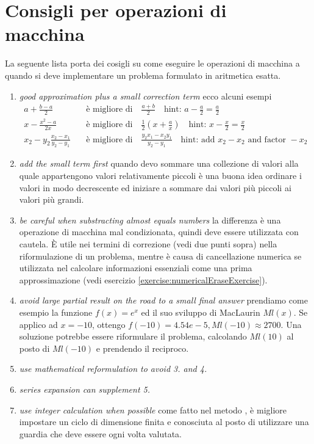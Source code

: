 \section{Consigli per operazioni di macchina}
La seguente lista porta dei cosigli su come eseguire le operazioni di macchina a
quando si deve implementare un problema formulato in aritmetica esatta.

\begin{enumerate}
\item \emph{good approximation plus a small correction term} ecco alcuni
esempi
\begin{displaymath}
\begin{split}
a + \frac{b - a}{2} \quad & \text{\`e migliore di} \quad \frac{a + b}{2} \quad
\text{hint: } a - \frac{a}{2} = \frac{a}{2} \\ 
x - \frac{x^{2} - a}{2x} \quad & \text{\`e migliore di} \quad \frac{1}{2}\left
(x + \frac{a}{x} \right ) \quad \text{hint: } x - \frac{x}{2} = \frac{x}{2} \\
x_{2} - y_{2} \frac{x_{2} - x_{1}}{y_{2} - y_{1}} \quad & \text{\`e migliore di}
\quad \frac{y_{2}x_{1} - x_{2}y_{1}}{y_{2} - y_{1}} \quad
\text{hint: add } x_{2} - x_{2} \text{ and factor } -x_{2}
\end{split}
\end{displaymath}
\item \emph{add the small term first} quando devo sommare una collezione di
valori alla quale appartengono valori relativamente piccoli \`e una buona idea ordinare
i valori in modo decrescente ed iniziare a sommare dai valori pi\`u piccoli ai
valori pi\`u grandi.
\item \emph{be careful when substracting almost equals numbers} la differenza
\`e una operazione di macchina mal condizionata, quindi deve essere utilizzata con
cautela. \`E utile nei termini di correzione (vedi due punti sopra) nella
riformulazione di un problema, mentre \`e causa di cancellazione numerica se
utilizzata nel calcolare informazioni essenziali come una prima approssimazione
(vedi esercizio \ref{exercise:numericalEraseExercise}).
\item \emph{avoid large partial result on the road to a small final answer}
prendiamo come esempio la funzione $f(x) = e^{x}$ ed il suo sviluppo di
MacLaurin  $Ml(x)$. Se applico ad $x = -10$, ottengo $f(-10) = 4.54e-5, Ml(-10) 
\approx 2700$. Una soluzione potrebbe essere riformulare il problema, calcolando
$Ml(10)$ al posto di $Ml(-10)$ e prendendo il reciproco.
\item \emph{use mathematical reformulation to avoid 3. and 4.}
\item \emph{series expansion can supplement 5.}
\item \emph{use integer calculation when possible} come fatto nel metodo
, \`e migliore impostare un ciclo di dimensione
finita e conosciuta al posto di utilizzare una guardia che deve essere ogni
volta valutata.
\end{enumerate}
